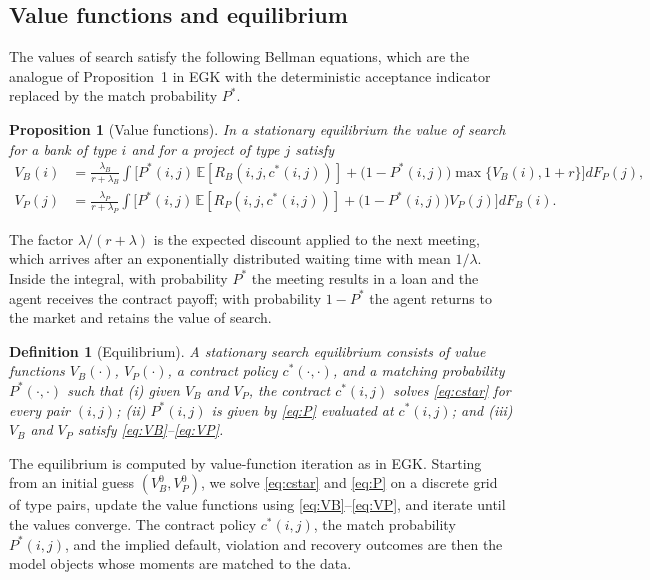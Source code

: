 \documentclass[12pt]{article}
\newtheorem{proposition}{Proposition}
\newtheorem{definition}{Definition}
\newcommand{\E}{\mathbb{E}}
\newcommand{\RB}{R_B}
\newcommand{\RP}{R_P}
\begin{document}
\subsection{Value functions and equilibrium}
\label{sec:equilibrium}

The values of search satisfy the following Bellman equations, which are the
analogue of Proposition~1 in EGK with the deterministic acceptance indicator
replaced by the match probability $P^*$.

\begin{proposition}[Value functions]
\label{prop:value}
In a stationary equilibrium the value of search for a bank of type $i$ and
for a project of type $j$ satisfy
\begin{align}
  V_B(i) &= \frac{\lambda_B}{r + \lambda_B}
  \int \Big[ P^*(i,j)\, \E[\RB(i,j,c^*(i,j))]
    + \big(1 - P^*(i,j)\big) \max\{V_B(i), 1 + r\} \Big] dF_P(j),
  \label{eq:VB} \\
  V_P(j) &= \frac{\lambda_P}{r + \lambda_P}
  \int \Big[ P^*(i,j)\, \E[\RP(i,j,c^*(i,j))]
    + \big(1 - P^*(i,j)\big) V_P(j) \Big] dF_B(i).
  \label{eq:VP}
\end{align}
\end{proposition}

The factor $\lambda/(r+\lambda)$ is the expected discount applied to the next
meeting, which arrives after an exponentially distributed waiting time with
mean $1/\lambda$. Inside the integral, with probability $P^*$ the meeting
results in a loan and the agent receives the contract payoff; with
probability $1 - P^*$ the agent returns to the market and retains the value
of search.

\begin{definition}[Equilibrium]
A stationary search equilibrium consists of value functions $V_B(\cdot)$,
$V_P(\cdot)$, a contract policy $c^*(\cdot,\cdot)$, and a matching
probability $P^*(\cdot,\cdot)$ such that (i) given $V_B$ and $V_P$, the
contract $c^*(i,j)$ solves \eqref{eq:cstar} for every pair $(i,j)$;
(ii) $P^*(i,j)$ is given by \eqref{eq:P} evaluated at $c^*(i,j)$; and
(iii) $V_B$ and $V_P$ satisfy \eqref{eq:VB}--\eqref{eq:VP}.
\end{definition}

The equilibrium is computed by value-function iteration as in EGK. Starting
from an initial guess $(V_B^0, V_P^0)$, we solve \eqref{eq:cstar} and
\eqref{eq:P} on a discrete grid of type pairs, update the value functions
using \eqref{eq:VB}--\eqref{eq:VP}, and iterate until the values converge.
The contract policy $c^*(i,j)$, the match probability $P^*(i,j)$, and the
implied default, violation and recovery outcomes are then the model objects
whose moments are matched to the data.
\end{document}
